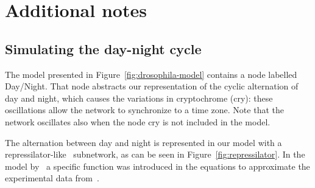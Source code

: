 \clearpage
\section{Additional notes}

\subsection{Simulating the day-night cycle}\label{suppl:repressilator}
The model presented in Figure~\ref{fig:drosophila-model} contains a node
labelled {\sf Day/Night}. That node abstracts our representation
of the cyclic alternation of day and night, which causes the variations
in cryptochrome ({\sf cry}): these oscillations allow the network
to synchronize to a time zone. Note that the network oscillates
also when the node {\sf cry} is not included in the model.

The alternation between day and night is represented in our model with a
repressilator-like~\citep{repressilator} subnetwork, as can be seen in Figure~\ref{fig:repressilator}.
In the model by~\cite{drosophila-ode-model} a specific function
was introduced in the equations to approximate the experimental data from~\cite{drosophila-cry-data}.

